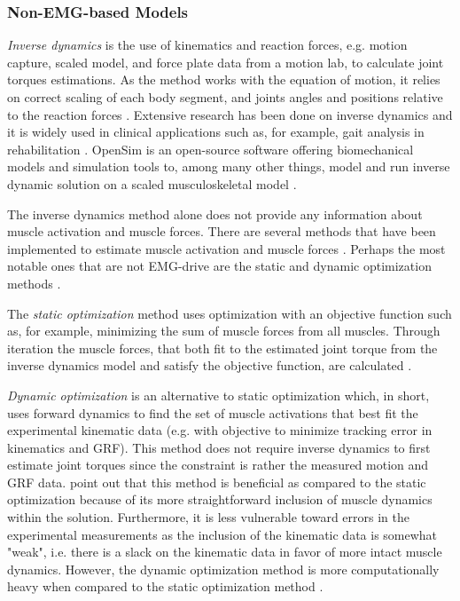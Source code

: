 \subsubsection{Non-\ac{EMG}-based Models}
\label{sec:A-NonEMGBasedModels}
\textit{Inverse dynamics} is the use of kinematics and reaction forces, e.g. motion capture, scaled model, and force plate data from a motion lab, to calculate joint torques estimations.
As the method works with the equation of motion, it relies on correct scaling of each body segment, and joints angles and positions relative to the reaction forces \cite{Buchanan2004,Erdemir2007}.
Extensive research has been done on inverse dynamics and it is widely used in clinical applications such as, for example, gait analysis in rehabilitation \cite{Erdemir2007,Buchanan2004,Pizzolato2015}.
OpenSim \cite{Delp2007, Seth2018} is an open-source software offering biomechanical models and simulation tools to, among many other things, model and run inverse dynamic solution on a scaled musculoskeletal model \cite{Buchanan2004, Delp2007, Seth2018, Pizzolato2017}.

The inverse dynamics method alone does not provide any information about muscle activation and muscle forces.
There are several methods that have been implemented to estimate muscle activation and muscle forces \cite{Erdemir2007}.
Perhaps the most notable ones that are not \ac{EMG}-drive are the static and dynamic optimization methods \cite{Erdemir2007, Delp2007, Pizzolato2015}. 

The \textit{static optimization} method uses optimization with an objective function such as, for example, minimizing the sum of muscle forces from all muscles. 
Through iteration the muscle forces, that both fit to the estimated joint torque from the inverse dynamics model and satisfy the objective function, are calculated \cite{Erdemir2007}. 

\textit{Dynamic optimization} is an alternative to static optimization which, in short, uses forward dynamics to find the set of muscle activations that best fit the experimental kinematic data (e.g. with objective to minimize tracking error in kinematics and \ac{GRF}). 
This method does not require inverse dynamics to first estimate joint torques since the constraint is rather the measured motion and \ac{GRF} data.
 point out that this method is beneficial as compared to the static optimization because of its more straightforward inclusion of muscle dynamics within the solution.
Furthermore, it is less vulnerable toward errors in the experimental measurements as the inclusion of the kinematic data is somewhat "weak", i.e. there is a slack on the kinematic data in favor of more intact muscle dynamics.
However, the dynamic optimization method is more computationally heavy when compared to the static optimization method \cite{Erdemir2007}.

